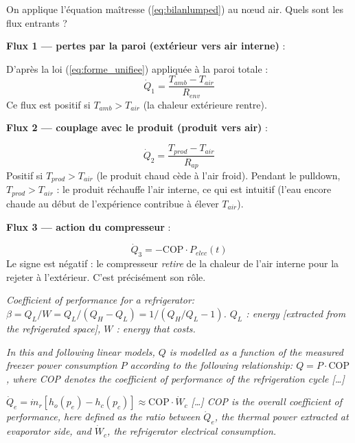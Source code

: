\documentclass[11pt,a4paper]{article}
\begin{document}
\begin{demo}
On applique l'équation maîtresse (\ref{eq:bilanlumped}) au nœud air. Quels sont les flux
entrants ?

\medskip
\textbf{Flux 1 — pertes par la paroi (extérieur vers air interne)} :

D'après la loi (\ref{eq:forme_unifiee}) appliquée à la paroi totale :
$$\dot Q_1 = \frac{T_{amb} - T_{air}}{R_{env}}$$
Ce flux est positif si $T_{amb} > T_{air}$ (la chaleur extérieure rentre).

\medskip
\textbf{Flux 2 — couplage avec le produit (produit vers air)} :

$$\dot Q_2 = \frac{T_{prod} - T_{air}}{R_{ap}}$$
Positif si $T_{prod} > T_{air}$ (le produit chaud cède à l'air froid). Pendant le pulldown,
$T_{prod} > T_{air}$ : le produit réchauffe l'air interne, ce qui est intuitif (l'eau encore
chaude au début de l'expérience contribue à élever $T_{air}$).

\medskip
\textbf{Flux 3 — action du compresseur} :

$$\dot Q_3 = -\mathrm{COP}\cdot P_{elec}(t)$$
Le signe est négatif : le compresseur \emph{retire} de la chaleur de l'air interne pour la
rejeter à l'extérieur. C'est précisément son rôle.

\begin{tcolorbox}[breakable,enhanced jigsaw,colback=yellow!10,colframe=yellow!50!black,boxrule=0.4pt,arc=2pt,
title=\textbf{Extrait textuel — Engineering Archives \ref{engarc_cop}, Eq.~1}]
\og{} \emph{Coefficient of performance for a refrigerator: $\beta = Q_L/W = Q_L/(Q_H - Q_L) = 1/(Q_H/Q_L - 1)$.
$Q_L$ : energy [extracted from the refrigerated space], $W$ : energy that costs.} \fg{}
\end{tcolorbox}

\begin{tcolorbox}[breakable,enhanced jigsaw,colback=yellow!10,colframe=yellow!50!black,boxrule=0.4pt,arc=2pt,
title=\textbf{Extrait textuel — Sossan et~al.\ (2016) \ref{sossan2016}, p.~3, Eq.~14}]
\og{} \emph{In this and following linear models, $Q$ is modelled as a function of the
measured freezer power consumption $P$ according to the following relationship:
$Q = P \cdot \mathrm{COP}$, where COP denotes the coefficient of performance of the
refrigeration cycle [\dots]} \fg{}
\end{tcolorbox}

\begin{tcolorbox}[breakable,enhanced jigsaw,colback=yellow!10,colframe=yellow!50!black,boxrule=0.4pt,arc=2pt,
title=\textbf{Extrait textuel — Costanzo et~al.\ (2013) \ref{costanzo2013}, p.~2, Eq.~2}]
\og{} \emph{$\dot Q_e = \dot m_r [h_o(p_e) - h_c(p_c)] \approx \mathrm{COP} \cdot \dot W_c$
[\dots] COP is the overall coefficient of performance, here defined as the ratio between
$\dot Q_e$, the thermal power extracted at evaporator side, and $\dot W_c$, the
refrigerator electrical consumption.} \fg{}
\end{tcolorbox}


\end{demo}
\end{document}
